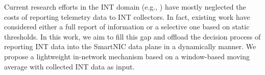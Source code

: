 Current research efforts in the INT domain (e.g., \cite{ben2020pint, tr21_lint, tang2019sel}) have mostly neglected the costs of reporting telemetry data to INT collectors. In fact, existing work have considered either a full report of information or a selective one based on static thresholds.
%
In this work, we aim to fill this gap and offload the decision process of reporting INT data into the SmartNIC data plane in a dynamically manner. We propose a lightweight in-network mechanism based on a window-based moving average with collected INT data as input.


